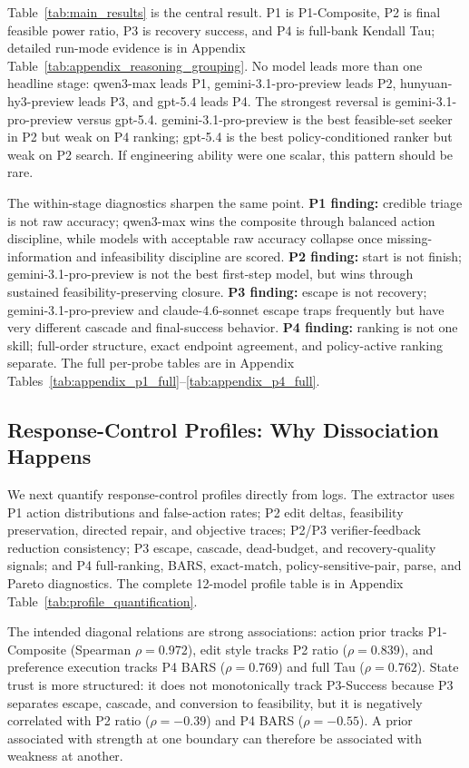 Table~\ref{tab:main_results} is the central result. P1 is P1-Composite, P2 is final feasible power ratio, P3 is recovery success, and P4 is full-bank Kendall Tau; detailed run-mode evidence is in Appendix Table~\ref{tab:appendix_reasoning_grouping}. No model leads more than one headline stage: qwen3-max leads P1, gemini-3.1-pro-preview leads P2, hunyuan-hy3-preview leads P3, and gpt-5.4 leads P4. The strongest reversal is gemini-3.1-pro-preview versus gpt-5.4. gemini-3.1-pro-preview is the best feasible-set seeker in P2 but weak on P4 ranking; gpt-5.4 is the best policy-conditioned ranker but weak on P2 search. If engineering ability were one scalar, this pattern should be rare.

The within-stage diagnostics sharpen the same point. \textbf{P1 finding:} credible triage is not raw accuracy; qwen3-max wins the composite through balanced action discipline, while models with acceptable raw accuracy collapse once missing-information and infeasibility discipline are scored. \textbf{P2 finding:} start is not finish; gemini-3.1-pro-preview is not the best first-step model, but wins through sustained feasibility-preserving closure. \textbf{P3 finding:} escape is not recovery; gemini-3.1-pro-preview and claude-4.6-sonnet escape traps frequently but have very different cascade and final-success behavior. \textbf{P4 finding:} ranking is not one skill; full-order structure, exact endpoint agreement, and policy-active ranking separate. The full per-probe tables are in Appendix Tables~\ref{tab:appendix_p1_full}--\ref{tab:appendix_p4_full}.

\subsection{Response-Control Profiles: Why Dissociation Happens}

We next quantify response-control profiles directly from logs. The extractor uses P1 action distributions and false-action rates; P2 edit deltas, feasibility preservation, directed repair, and objective traces; P2/P3 verifier-feedback reduction consistency; P3 escape, cascade, dead-budget, and recovery-quality signals; and P4 full-ranking, BARS, exact-match, policy-sensitive-pair, parse, and Pareto diagnostics. The complete 12-model profile table is in Appendix Table~\ref{tab:profile_quantification}.

The intended diagonal relations are strong associations: action prior tracks P1-Composite (Spearman \(\rho=0.972\)), edit style tracks P2 ratio (\(\rho=0.839\)), and preference execution tracks P4 BARS (\(\rho=0.769\)) and full Tau (\(\rho=0.762\)). State trust is more structured: it does not monotonically track P3-Success because P3 separates escape, cascade, and conversion to feasibility, but it is negatively correlated with P2 ratio (\(\rho=-0.39\)) and P4 BARS (\(\rho=-0.55\)). A prior associated with strength at one boundary can therefore be associated with weakness at another.

